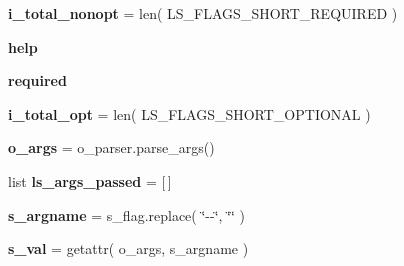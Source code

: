 \begin{DoxyCompactItemize}
\item 
{\bfseries i\+\_\+total\+\_\+nonopt} = len( L\+S\+\_\+\+F\+L\+A\+G\+S\+\_\+\+S\+H\+O\+R\+T\+\_\+\+R\+E\+Q\+U\+I\+R\+ED )\hypertarget{namespacenegui_1_1pgdriveneestimator_aa4e6982ff99236ac13e0af4c4d6e8839}{}\label{namespacenegui_1_1pgdriveneestimator_aa4e6982ff99236ac13e0af4c4d6e8839}

\item 
{\bfseries help}\hypertarget{namespacenegui_1_1pgdriveneestimator_ad407ca10f30961eabc0630c21fe8da45}{}\label{namespacenegui_1_1pgdriveneestimator_ad407ca10f30961eabc0630c21fe8da45}

\item 
{\bfseries required}\hypertarget{namespacenegui_1_1pgdriveneestimator_ab5c3d005ba8659dc07a5f3171c7214df}{}\label{namespacenegui_1_1pgdriveneestimator_ab5c3d005ba8659dc07a5f3171c7214df}

\item 
{\bfseries i\+\_\+total\+\_\+opt} = len( L\+S\+\_\+\+F\+L\+A\+G\+S\+\_\+\+S\+H\+O\+R\+T\+\_\+\+O\+P\+T\+I\+O\+N\+AL )\hypertarget{namespacenegui_1_1pgdriveneestimator_a3c6b1b9d9500e05eca62433ac13c8692}{}\label{namespacenegui_1_1pgdriveneestimator_a3c6b1b9d9500e05eca62433ac13c8692}

\item 
{\bfseries o\+\_\+args} = o\+\_\+parser.\+parse\+\_\+args()\hypertarget{namespacenegui_1_1pgdriveneestimator_abff5b751b69197ab0c78f53cf34e3a05}{}\label{namespacenegui_1_1pgdriveneestimator_abff5b751b69197ab0c78f53cf34e3a05}

\item 
list {\bfseries ls\+\_\+args\+\_\+passed} = \mbox{[}$\,$\mbox{]}\hypertarget{namespacenegui_1_1pgdriveneestimator_af517e995e63706b0e5297adb3a372e43}{}\label{namespacenegui_1_1pgdriveneestimator_af517e995e63706b0e5297adb3a372e43}

\item 
{\bfseries s\+\_\+argname} = s\+\_\+flag.\+replace( \char`\"{}-\/-\/\char`\"{}, \char`\"{}\char`\"{} )\hypertarget{namespacenegui_1_1pgdriveneestimator_af8fac37bc1806ab9f054b8c4754e669e}{}\label{namespacenegui_1_1pgdriveneestimator_af8fac37bc1806ab9f054b8c4754e669e}

\item 
{\bfseries s\+\_\+val} = getattr( o\+\_\+args, s\+\_\+argname )\hypertarget{namespacenegui_1_1pgdriveneestimator_a801907b0dbfc713d2a817781f2b3c7d4}{}\label{namespacenegui_1_1pgdriveneestimator_a801907b0dbfc713d2a817781f2b3c7d4}

\end{DoxyCompactItemize}


